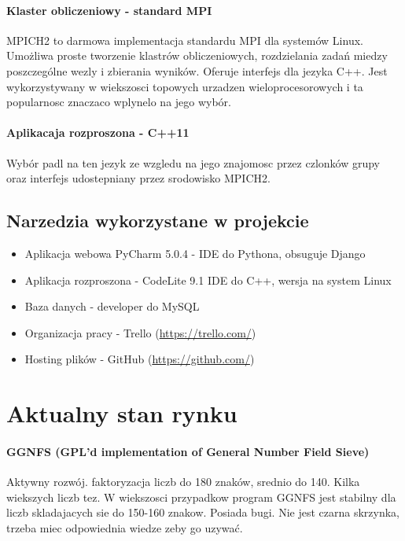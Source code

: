 \documentclass{article}
\begin{document}
\paragraph{Klaster obliczeniowy - standard MPI\cite{mpich2}} MPICH2 to darmowa implementacja standardu MPI dla systemów Linux. Umożliwa proste tworzenie klastrów obliczeniowych, rozdzielania zadań miedzy poszczególne wezly i zbierania wyników. Oferuje interfejs dla jezyka C++. Jest wykorzystywany w wiekszosci topowych urzadzen wieloprocesorowych i ta popularnosc znaczaco wplynelo na jego wybór.

\paragraph{Aplikacaja rozproszona - C++11}
Wybór padl na ten jezyk ze wzgledu na jego znajomosc przez czlonków grupy oraz interfejs udostepniany przez srodowisko MPICH2.

\subsection{Narzedzia wykorzystane w projekcie}
\begin{itemize}
\item Aplikacja webowa PyCharm 5.0.4 - IDE do Pythona, obsuguje Django
\item Aplikacja rozproszona - CodeLite 9.1 IDE do C++, wersja na system Linux
\item Baza danych - developer do MySQL
\item Organizacja pracy - Trello (\url{https://trello.com/})
\item Hosting plików - GitHub (\url{https://github.com/}) 
\end{itemize}

\section{Aktualny stan rynku\cite{cfracinz}}

\paragraph{GGNFS (GPL'd implementation of General Number Field Sieve)} Aktywny rozwój. faktoryzacja liczb do 180 znaków, srednio do 140. Kilka wiekszych liczb tez. W wiekszosci przypadkow program GGNFS jest stabilny dla liczb skladajacych sie do 150-160 znakow. Posiada bugi. Nie jest czarna skrzynka, trzeba miec odpowiednia wiedze zeby go uzywać.
\end{document}
